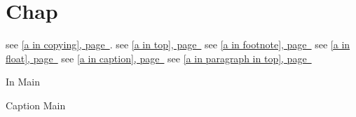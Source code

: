 \documentclass{book}
\renewcommand{\_}{\Texinfounderscore\discretionary{}{}{}}
\begin{document}
\label{anchor:Top}%
\label{anchor:a-in-top}%
\label{anchor:a-in-paragraph-in-top}%
\label{anchor:a-in-float}%
\label{anchor:My-Flist}%
\chapter{{Chap}}
\label{anchor:chapter}%

see \hyperref[anchor:a-in-copying]{[a in copying], page~\pageref*{anchor:a-in-copying}}.
see \hyperref[anchor:a-in-top]{[a in top], page~\pageref*{anchor:a-in-top}}
see \hyperref[anchor:a-in-footnote]{[a in footnote], page~\pageref*{anchor:a-in-footnote}}
see \hyperref[anchor:a-in-float]{[a in float], page~\pageref*{anchor:a-in-float}}
see \hyperref[anchor:a-in-caption]{[a in caption], page~\pageref*{anchor:a-in-caption}}
see \hyperref[anchor:a-in-paragraph-in-top]{[a in paragraph in top], page~\pageref*{anchor:a-in-paragraph-in-top}}

%

\printindex[cp]

\begin{TexinfoFloatlist}
In Main
\caption{Caption Main}

\label{anchor:Main-Flist}%
\end{TexinfoFloatlist}

\end{document}
